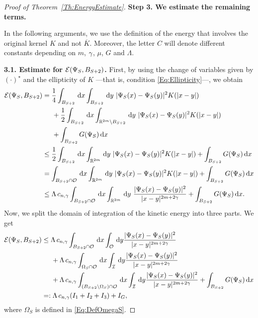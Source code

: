\begin{proof}[Proof of Theorem~\ref{Th:EnergyEstimate}]
\textbf{Step 3. We estimate the remaining terms.}

In the following arguments, we use the definition of the energy that involves the original kernel $K$ and not $\overline{K}$. Moreover, the letter $C$ will denote different constants depending on $m$, $\gamma$, $\mu$, $G$ and $\Lambda$.

\textbf{3.1. Estimate for $\mathcal{E}(\Psi_S,B_{S+2})$.}
First, by using the change of variables given by $(\cdot)^\star$ and the ellipticity of $K$ ---that is, condition \eqref{Eq:Ellipticity}---, we obtain
\begin{align*}
\ecal(\Psi_S,B_{S+2}) &= \frac{1}{4} \int_{B_{S+2}} \d x \int_{B_{S+2}} \d y\ |\Psi_S(x)-\Psi_S(y)|^2K(|x-y|)  \\
&\hspace{5mm} +\frac{1}{2} \int_{B_{S+2}} \d x \int_{\R^{2m} \setminus B_{S+2}} \d y \ |\Psi_S(x)-\Psi_S(y)|^2K(|x-y|) \\
&\hspace{5mm} + \int_{B_{S+2}} G(\Psi_S)  \d x\\
&\leq \frac{1}{2} \int_{B_{S+2}} \d x \int_{\R^{2m}} \d y\ |\Psi_S(x)-\Psi_S(y)|^2K(|x-y|) + \int_{B_{S+2}} G(\Psi_S) \d x \\
&= \int_{B_{S+2} \cap \ocal} \d x \int_{\R^{2m}} \d y\ |\Psi_S(x)-\Psi_S(y)|^2K(|x-y|)  + \int_{B_{S+2}} G(\Psi_S) \d x \\
&\leq \Lambda\, c_{n,\s} \int_{B_{S+2} \cap \ocal} \d x \int_{\R^{2m}} \d y \ \frac{|\Psi_S(x)-\Psi_S(y)|^2}{|x-y|^{2m+2\s}} + \int_{B_{S+2}} G(\Psi_S) \d x.
\end{align*}
Now, we split the domain of integration of the kinetic energy into three parts. We get
\begin{align*}
\mathcal{E}(\Psi_S,B_{S+2}) &\leq \Lambda\, c_{n,\gamma} \int_{B_{S+2} \cap \mathcal{O}} \,\mathrm{d} x \int_{\mathcal{O}} \,\mathrm{d} y \frac{|\Psi_S(x)-\Psi_S(y)|^2}{|x-y|^{2m+2\gamma}} \\
&\hspace{5mm} + \Lambda\, c_{n,\gamma} \int_{\Omega_S \cap \mathcal{O}} \,\mathrm{d} x \int_{\mathcal{I}} \,\mathrm{d} y \frac{|\Psi_S(x)-\Psi_S(y)|^2}{|x-y|^{2m+2\gamma}} \\
&\hspace{5mm} + \Lambda\, c_{n,\gamma} \int_{(B_{S+2}\setminus \Omega_S) \cap \mathcal{O}} \,\mathrm{d} x \int_{\mathcal{I}} \,\mathrm{d} y \frac{|\Psi_S(x)-\Psi_S(y)|^2}{|x-y|^{2m+2\gamma}} + \int_{B_{S+2}} G(\Psi_S) \,\mathrm{d} x\\
&=:\Lambda\, c_{n,\gamma} (I_1+I_2+I_3)+I_G,
\end{align*}
where $\Omega_S$ is defined in \eqref{Eq:DefOmegaS}. 


\end{proof}
